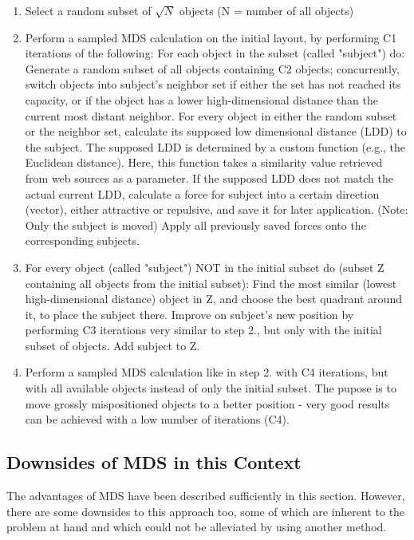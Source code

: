 \begin{enumerate}
	\item Select a random subset of $\sqrt{N}$ objects (N = number of all objects)
	\item Perform a sampled MDS calculation on the initial layout, by performing C1 iterations of the following:
		\subitem For each object in the subset (called "subject") do:
			\subsubitem Generate a random subset of all objects containing C2 objects; concurrently, switch objects into subject's neighbor set if either the set has not reached its capacity, or if the object has a lower high-dimensional distance than the current most distant neighbor.
			\subsubitem For every object in either the random subset or the neighbor set, calculate its supposed low dimensional distance (LDD) to the subject. The supposed LDD is determined by a custom function (e.g., the Euclidean distance). Here, this function takes a similarity value retrieved from web sources as a parameter.
			\subsubitem If the supposed LDD does not match the actual current LDD, calculate a force for subject into a certain direction (vector), either attractive or repulsive, and save it for later application. (Note: Only the subject is moved)
		\subitem Apply all previously saved forces onto the corresponding subjects.
	\item For every object (called "subject") NOT in the initial subset do (subset Z containing all objects from the initial subset):
		\subitem Find the most similar (lowest high-dimensional distance) object in Z, and choose the best quadrant around it, to place the subject there. 
		\subitem Improve on subject's new position by performing C3 iterations very similar to step 2., but only with the initial subset of objects.
		\subitem Add subject to Z.
	\item Perform a sampled MDS calculation like in step 2. with C4 iterations, but with all available objects instead of only the initial subset. The pupose is to move grossly mispositioned objects to a better position - very good results can be achieved with a low number of iterations (C4).
		
\end{enumerate}

\subsection{Downsides of MDS in this Context}

The advantages of MDS have been described sufficiently in this section. However, there are some downsides to this approach too, some of which are inherent to the problem at hand and which could not be alleviated by using another method.

